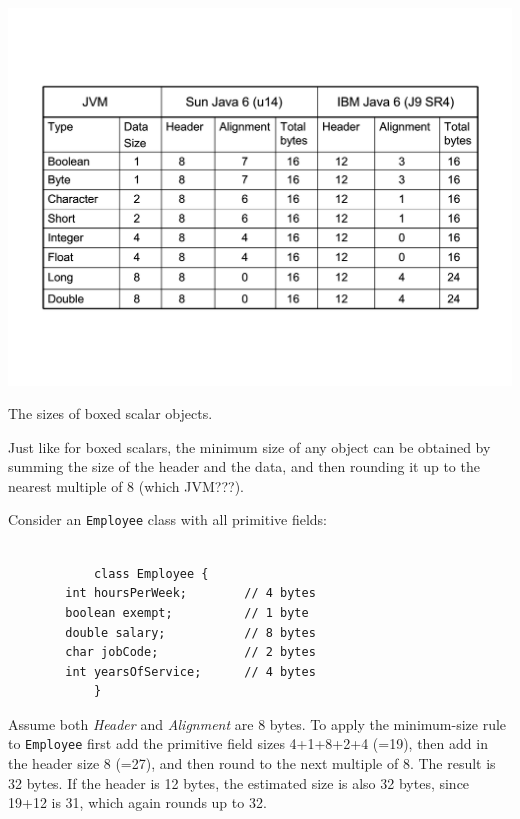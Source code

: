 \begin{table}
  \centering
 \includegraphics[width=.70\textwidth]{Figures/chapter4/boxed-scalar-sizes.pdf}
  \caption{The sizes of boxed scalar objects.}
  \label{tab:boxed-scalar-sizes}
\end{table} 
Just like for boxed scalars, the minimum  size of any object can be obtained by summing the size of the header and the data, and then rounding it up to the nearest multiple of 8 (which JVM???).  
 

\begin{example}
Consider an \texttt{Employee} class with all primitive fields:

\ttfamily
\begin{verbatim} 

			class Employee {
        int hoursPerWeek;        // 4 bytes
        boolean exempt;          // 1 byte
        double salary;           // 8 bytes
        char jobCode;            // 2 bytes
        int yearsOfService;      // 4 bytes
			}
\end{verbatim}
\normalfont
Assume both \textit{Header} and \textit{Alignment} are 8 bytes. To apply the minimum-size rule to \texttt{Employee} first add the primitive field sizes 4+1+8+2+4 (=19), then add in the header size 8 (=27), and then round to the next multiple of 8. The result is 32 bytes.  If the header is 12 bytes, the estimated size is also 32 bytes, since 19+12 is 31, which again rounds up to 32. 
\end{example}


